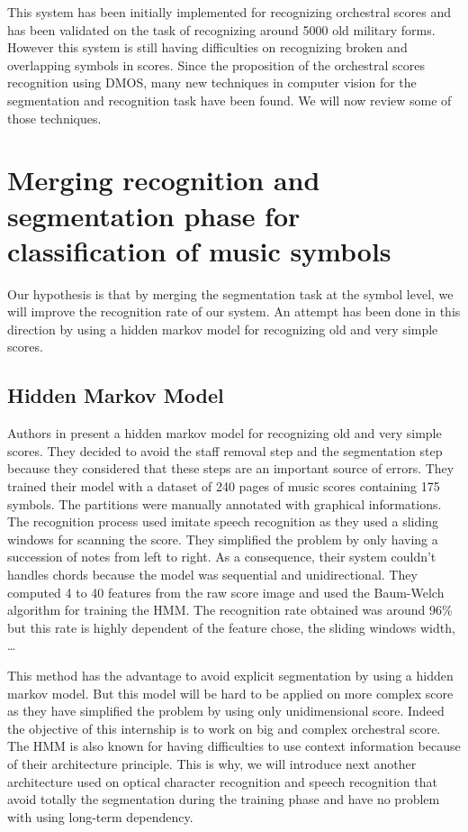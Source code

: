 \documentclass[11pt]{sdm}
\begin{document}
This system has been initially implemented for recognizing orchestral scores and has been validated on the task of recognizing around 5000 old military forms.
However this system is still having difficulties on recognizing broken and overlapping symbols in scores.
Since the proposition of the orchestral scores recognition using DMOS, many new techniques in computer vision for the segmentation and recognition task have been found.
We will now review some of those techniques.

\section{Merging recognition and segmentation phase for classification of music symbols}

Our hypothesis is that by merging the segmentation task at the symbol level, we will improve the recognition rate of our system.
An attempt has been done in this direction by using a hidden markov model for recognizing old and very simple scores.

\subsection{Hidden Markov Model}

Authors in \cite{pugin_optical_2006} present a hidden markov model for recognizing old and very simple scores.
They decided to avoid the staff removal step and the segmentation step because they considered that these steps are an important source of errors.
They trained their model with a dataset of 240 pages of music scores containing 175 symbols.
The partitions were manually annotated with graphical informations.
The recognition process used imitate speech recognition as they used a sliding windows for scanning the score.
They simplified the problem by only having a succession of notes from left to right.
As a consequence, their system couldn't handles chords because the model was sequential and unidirectional.
They computed 4 to 40 features from the raw score image and used the Baum-Welch algorithm for training the HMM.
The recognition rate obtained was around 96\% but this rate is highly dependent of the feature chose, the sliding windows width, \ldots

This method has the advantage to avoid explicit segmentation by using a hidden markov model.
But this model will be hard to be applied on more complex score as they have simplified the problem by using only unidimensional score.
Indeed the objective of this internship is to work on big and complex orchestral score.
The HMM is also known for having difficulties to use context information because of their architecture principle.
This is why, we will introduce next another architecture used on optical character recognition and speech recognition that avoid totally the segmentation during the training phase and have no problem with using long-term dependency.
\end{document}
